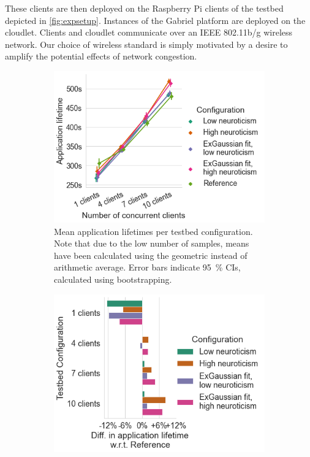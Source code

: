 These clients are then deployed on the Raspberry Pi clients of the testbed depicted in \cref{fig:expsetup}.
Instances of the Gabriel platform are deployed on the cloudlet.
Clients and cloudlet communicate over an \gls{IEEE} \num{802.11}b/g wireless network.
Our choice of wireless standard is simply motivated by a desire to amplify the potential effects of network congestion.

\begin{figure}
    \centering
    \begin{subfigure}[t]{.45\textwidth}
        \centering
        \includegraphics[width=\textwidth]{figs/new_model/lifetime_testbed}
        \caption{%
            Mean application lifetimes per testbed configuration.
            Note that due to the low number of samples, means have been calculated using the geometric instead of arithmetic average. 
            Error bars indicate \SI{95}{\percent} \glspl{CI}, calculated using bootstrapping.
        }
    \end{subfigure}%
    \hfill%
    \begin{subfigure}[t]{.45\textwidth}
        \centering
        \includegraphics[width=\textwidth]{figs/new_model/lifetime_testbed_diff}

\end{subfigure}
\end{figure}
